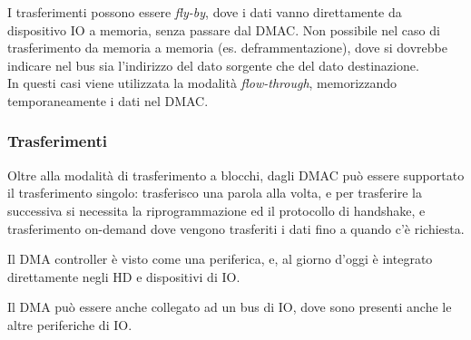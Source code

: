 \documentclass[../template]{subfiles}
\begin{document}
I trasferimenti possono essere \textit{fly-by}, dove i dati vanno direttamente da dispositivo IO a memoria, senza passare dal DMAC. Non possibile nel caso di trasferimento da memoria a memoria (es. deframmentazione), dove si dovrebbe indicare nel bus sia l'indirizzo del dato sorgente che del dato destinazione.
\\
In questi casi viene utilizzata la modalità \textit{flow-through}, memorizzando temporaneamente i dati nel DMAC.


\subsubsection{Trasferimenti}
Oltre alla modalità di trasferimento a blocchi, dagli DMAC può essere supportato il trasferimento singolo: trasferisco una parola alla volta, e per trasferire la successiva si necessita la riprogrammazione ed il protocollo di handshake, e trasferimento on-demand dove vengono trasferiti i dati fino a quando c'è richiesta.

Il DMA controller è visto come una periferica, e, al giorno d'oggi è integrato direttamente negli HD e dispositivi di IO.

Il DMA può essere anche collegato ad un bus di IO, dove sono presenti anche le altre periferiche di IO.
\end{document}
